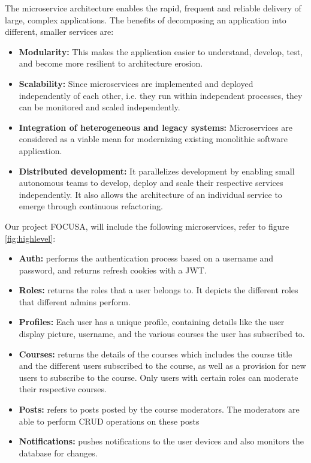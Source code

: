 The microservice architecture enables the rapid, frequent and reliable delivery of large, complex applications.
The benefits of decomposing an application into different, smaller services are:
\begin{itemize}
    \item \textbf{Modularity:} This makes the application easier to understand, develop, test, and 
    become more resilient to architecture erosion.
    \item \textbf{Scalability:} Since microservices are implemented and deployed independently of 
    each other, i.e. they run within independent processes, they can be monitored and scaled independently.
    \item \textbf{Integration of heterogeneous and legacy systems:} Microservices are considered as a 
    viable mean for modernizing existing monolithic software application.
    \item \textbf{Distributed development:} It parallelizes development by enabling small autonomous teams to
    develop, deploy and scale their respective services independently. It also allows the architecture of 
    an individual service to emerge through continuous refactoring.
\end{itemize}

Our project FOCUSA, will include the following microservices, refer to figure \ref{fig:highlevel}:
\begin{itemize}
    \item \textbf{Auth:} performs the authentication process based on a username and password, and returns refresh cookies with a JWT.
    \item \textbf{Roles:}  returns the roles that a user belongs to. It depicts the different roles that different admins perform.
    \item \textbf{Profiles:} Each user has a unique profile, containing details like the user display picture, username, and the various courses the user has subscribed to.
    \item \textbf{Courses:}  returns the details of the courses which includes the course title and the different users subscribed to the course, as well as a provision for new users to subscribe to the course. Only users with certain roles can moderate their respective courses.
    \item \textbf{Posts:} refers to posts posted by the course moderators. The moderators are able to perform CRUD operations on these posts
    \item \textbf{Notifications:}  pushes notifications to the user devices and also monitors the database for changes.
\end{itemize}

